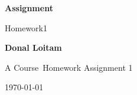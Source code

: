 \documentclass[10pt, a4paper]{article}
\newcommand\course{Course}                      %
\newcommand\hwnumber{1}                         %
\begin{document}
\begin{titlepage}
    \begin{center}
        \vspace*{3cm}
            
        \Huge
        \textbf{Assignment}
            
        \vspace{1cm}
        \huge
        Homework\hwnumber
            
        \vspace{1.5cm}
        \Large
            
        \textbf{Donal Loitam}                     
        
            
        \vfill
        
        A \course \ Homework Assignment 1
            
        \vspace{1cm}
            
       
       
        
        \Large
        
        \today
            
    \end{center}
\end{titlepage}


\newpage
\begin{Problem}

\end{Problem}
    
\end{document}
